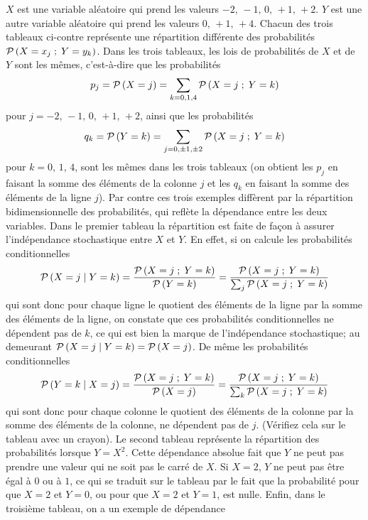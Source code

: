 $X$ est une variable al\'eatoire qui prend les valeurs $-2,\, -1,\, 0,\, +1,\, 
+2$. $Y$ est une autre variable al\'eatoire qui prend les valeurs $0,\, +1,\, 
+4$. Chacun des trois tableaux ci-contre repr\'esente une r\'epartition
diff\'erente des probabilit\'es ${\cal P}\, (  X = x_j \; ; \; Y = y_k )$.
Dans les trois tableaux, les lois de probabilit\'es de $X$ et de $Y$ sont les
m\^emes, c'est-\`a-dire que les probabilit\'es
$$p_j = {\cal P}\, (X = j) = \sum_{k=0,1,4} {\cal P}\, (X = j\; ;\; Y = k)$$
pour $j = -2,\,   -1,\,   0,\,   +1,\,   +2$, ainsi que  les probabilit\'es
$$q_k = {\cal P}\, (Y = k) = \sum_{j=0,\pm 1,\pm 2} {\cal P}\, (X = j\; ; \; 
Y = k)$$ 
pour $k = 0,\,  1,\,  4$, sont les m\^emes dans les trois tableaux (on
obtient les $p_j$ en faisant la somme des \'el\'ements de la colonne $j$ 
et les $q_k$ en faisant la somme des \'el\'ements de la ligne $j$). Par
contre ces trois exemples diff\`erent par la r\'epartition bidimensionnelle
des probabilit\'es, qui refl\`ete la d\'ependance entre les deux variables.
\medskip
Dans le premier tableau la r\'epartition est faite de fa\c{c}on \`a assurer
l'ind\'ependance stochastique entre $X$ et $Y$. En effet, si on calcule les
probabilit\'es conditionnelles 
$${\cal P}\, (X = j \mid Y = k) = {{\cal P}\, (X = j \; ; \; Y = k) \over  {\cal
P}\, (Y = k)} = {{\cal P}\, (X = j \; ; \; Y = k) \over \sum_j {\cal
P}\, (X = j \; ; \; Y = k)}$$
qui sont donc pour chaque ligne le quotient des \'el\'ements de la ligne
par la somme des \'el\'ements de la ligne, on constate que ces 
probabilit\'es conditionnelles ne d\'ependent pas de $k$, ce qui est bien   
la marque de l'ind\'ependance stochastique; au demeurant ${\cal P}\, (X =
j  \mid Y = k) = {\cal P}\, (X = j)$. De m\^eme les probabilit\'es
conditionnelles   
$${\cal P}\, (Y = k \mid X = j) = {{\cal P}\, (X = j \; ; \; Y =
k) \over  {\cal P}\, (X = j)} = {{\cal P}\, (X = j \; ; \; Y = k) \over \sum_k
{\cal P}\, (X = j \; ; \; Y = k)}$$
qui sont donc pour chaque colonne le quotient des \'el\'ements de la 
colonne par la somme des \'el\'ements de la colonne, ne d\'ependent pas 
de $j$. (V\'erifiez cela sur le tableau avec un crayon). 
\medskip
Le second tableau repr\'esente la r\'epartition des probabilit\'es lorsque 
$Y = X^2$. Cette d\'ependance absolue fait que $Y$ ne peut pas prendre une
valeur qui ne soit pas le carr\'e de $X$. Si $X=2$, $Y$ ne peut pas \^etre
\'egal \`a $0$ ou \`a $1$, ce qui se traduit sur le tableau par le fait que la
probabilit\'e pour que $X=2$ et $Y=0$, ou pour que $X=2$ et $Y=1$, est
nulle.  
\medskip
Enfin, dans le troisi\`eme tableau, on a un exemple de d\'ependance
